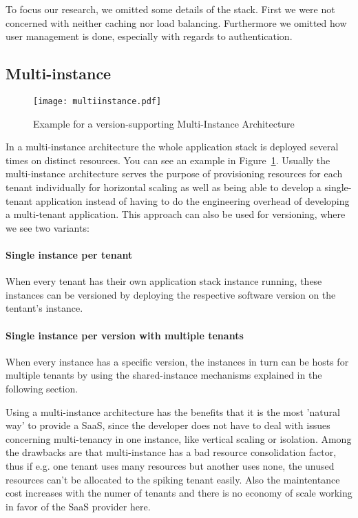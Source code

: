 To focus our research, we omitted some details of the stack. First we were not concerned with neither caching nor load balancing. Furthermore we omitted how user management is done, especially with regards to authentication.

\subsection{Multi-instance}

\begin{figure}
\centering
\texttt{[image: multiinstance.pdf]}
\caption{Example for a version-supporting Multi-Instance Architecture}
\label{fig:multiinstance}
\end{figure}

In a multi-instance architecture the whole application stack is deployed several times on distinct resources. You can see an example in Figure~\ref{fig:multiinstance}. Usually the multi-instance architecture serves the purpose of provisioning resources for each tenant individually for horizontal scaling as well as being able to develop a single-tenant application instead of having to do the engineering overhead of developing a multi-tenant application. This approach can also be used for versioning, where we see two variants:

\paragraph{Single instance per tenant} When every tenant has their own application stack instance running, these instances can be versioned by deploying the respective software version on the tentant's instance.
\paragraph{Single instance per version with multiple tenants} When every instance has a specific version, the instances in turn can be hosts for multiple tenants by using the shared-instance mechanisms explained in the following section.

Using a multi-instance architecture has the benefits that it is the most 'natural way' to provide a SaaS, since the developer does not have to deal with issues concerning multi-tenancy in one instance, like vertical scaling or isolation. Among the drawbacks are that multi-instance has a bad resource consolidation factor, thus if e.g. one tenant uses many resources but another uses none, the unused resources can't be allocated to the spiking tenant easily. Also the maintentance cost increases with the numer of tenants and there is no economy of scale working in favor of the SaaS provider here.

